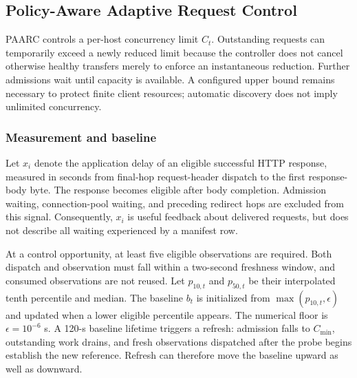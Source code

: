 \subsection{Policy-Aware Adaptive Request Control}
PAARC controls a per-host concurrency limit $C_t$. Outstanding requests can temporarily exceed a newly reduced limit because the controller does not cancel otherwise healthy transfers merely to enforce an instantaneous reduction. Further admissions wait until capacity is available. A configured upper bound remains necessary to protect finite client resources; automatic discovery does not imply unlimited concurrency.

\subsubsection{Measurement and baseline}
Let $x_i$ denote the application delay of an eligible successful HTTP response, measured in seconds from final-hop request-header dispatch to the first response-body byte. The response becomes eligible after body completion. Admission waiting, connection-pool waiting, and preceding redirect hops are excluded from this signal. Consequently, $x_i$ is useful feedback about delivered requests, but does not describe all waiting experienced by a manifest row.

At a control opportunity, at least five eligible observations are required. Both dispatch and observation must fall within a two-second freshness window, and consumed observations are not reused. Let $p_{10,t}$ and $p_{50,t}$ be their interpolated tenth percentile and median. The baseline $b_t$ is initialized from $\max(p_{10,t},\epsilon)$ and updated when a lower eligible percentile appears. The numerical floor is $\epsilon=10^{-6}$ s. A 120-s baseline lifetime triggers a refresh: admission falls to $C_{\min}$, outstanding work drains, and fresh observations dispatched after the probe begins establish the new reference. Refresh can therefore move the baseline upward as well as downward.

